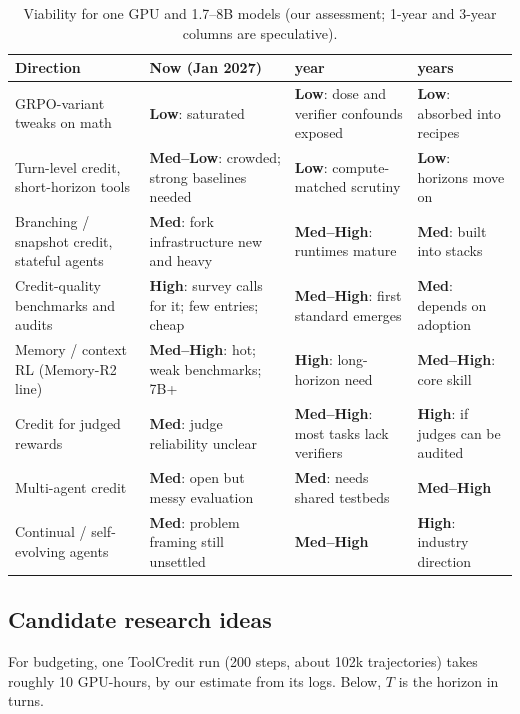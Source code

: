 \begin{table}[t]
\centering
\footnotesize
\caption{Viability for one GPU and 1.7--8B models (our assessment; 1-year and 3-year columns are speculative).}
\label{tab:agenda-viability}
\begin{tabularx}{\linewidth}{@{}>{\raggedright\arraybackslash}p{2.7cm}>{\raggedright\arraybackslash}X>{\raggedright\arraybackslash}X>{\raggedright\arraybackslash}X@{}}
\toprule
Direction & Now (Jan 2027) & 1 year & 3 years \\
\midrule
GRPO-variant tweaks on math & \textbf{Low}: saturated & \textbf{Low}: dose and verifier confounds exposed & \textbf{Low}: absorbed into recipes \\
Turn-level credit, short-horizon tools & \textbf{Med--Low}: crowded; strong baselines needed & \textbf{Low}: compute-matched scrutiny & \textbf{Low}: horizons move on \\
Branching / snapshot credit, stateful agents & \textbf{Med}: fork infrastructure new and heavy & \textbf{Med--High}: runtimes mature & \textbf{Med}: built into stacks \\
Credit-quality benchmarks and audits & \textbf{High}: survey calls for it; few entries; cheap & \textbf{Med--High}: first standard emerges & \textbf{Med}: depends on adoption \\
Memory / context RL (Memory-R2 line) & \textbf{Med--High}: hot; weak benchmarks; 7B+ & \textbf{High}: long-horizon need & \textbf{Med--High}: core skill \\
Credit for judged rewards & \textbf{Med}: judge reliability unclear & \textbf{Med--High}: most tasks lack verifiers & \textbf{High}: if judges can be audited \\
Multi-agent credit & \textbf{Med}: open but messy evaluation & \textbf{Med}: needs shared testbeds & \textbf{Med--High} \\
Continual / self-evolving agents & \textbf{Med}: problem framing still unsettled & \textbf{Med--High} & \textbf{High}: industry direction \\
\bottomrule
\end{tabularx}
\end{table}

\subsection{Candidate research ideas}

For budgeting, one ToolCredit run (200 steps, about 102k trajectories) takes roughly 10 GPU-hours, by our estimate from its logs. Below, $T$ is the horizon in turns.

